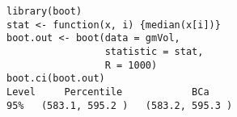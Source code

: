 \documentclass[aspectratio=169]{beamer}
\begin{document}
\begin{frame}[fragile]
\begin{verbatim}
library(boot)
stat <- function(x, i) {median(x[i])}  
boot.out <- boot(data = gmVol,
                 statistic = stat,
                 R = 1000)
boot.ci(boot.out)
Level     Percentile            BCa          
95%   (583.1, 595.2 )   (583.2, 595.3 )  
\end{verbatim}
\end{frame}
\end{document}
